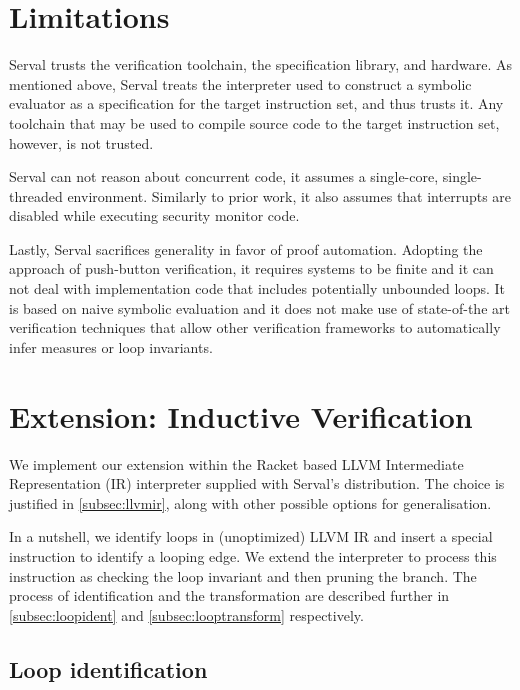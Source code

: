 \documentclass[11pt,a4paper,runningheads]{llncs}
\begin{document}
\section{Limitations}

Serval trusts the verification toolchain, the specification library, and hardware.
As mentioned above, Serval treats the interpreter used to construct a symbolic
evaluator as a specification for the target instruction set, and thus trusts it.
Any toolchain that may be used to compile source code to the target instruction
set, however, is not trusted.

Serval can not reason about concurrent code, it assumes a single-core,
single-threaded environment. 
Similarly to prior work, it also assumes that interrupts are disabled while
executing security monitor code.

Lastly, Serval sacrifices generality in favor of proof automation. 
Adopting the approach of push-button verification, it requires systems to be
finite and it can not deal with implementation code that includes
potentially unbounded loops. It is based on naive symbolic evaluation and it
does not make use of state-of-the art verification techniques that allow other
verification frameworks to automatically infer measures or loop invariants.

\section{Extension: Inductive Verification}

We implement our extension within the Racket based LLVM Intermediate
Representation (IR) interpreter supplied with Serval's distribution. The choice
is justified in \autoref{subsec:llvmir}, along with other possible options for
generalisation.

In a nutshell, we identify loops in (unoptimized) LLVM IR and insert a special
instruction to identify a looping edge. We extend the interpreter to process
this instruction as checking the loop invariant and then pruning the branch. The
process of identification and the transformation are described further in
\autoref{subsec:loopident} and \ref{subsec:looptransform} respectively.

\subsection{Loop identification}
\label{subsec:loopident}
\end{document}
